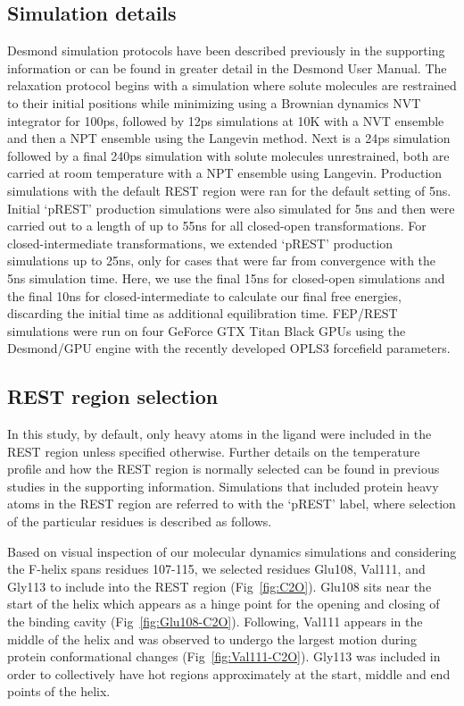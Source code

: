 \documentclass[journal=jctcce,manuscript=article]{achemso}
\begin{document}
\subsection*{Simulation details}
Desmond\cite{DESMONDSoftware,DESMONDarticle,DESMONDPaper1,DESMONDPaper2} simulation protocols have been described previously in the supporting information\cite{FEPplus} or can be found in greater detail in the Desmond User Manual\cite{DESMONDManual}.
The relaxation protocol begins with a simulation where solute molecules are restrained to their initial positions while minimizing using a Brownian dynamics NVT integrator for 100ps, followed by 12ps simulations at 10K with a NVT ensemble and then a NPT ensemble using the Langevin method\cite{Langevin}.
Next is a 24ps simulation followed by a final 240ps simulation with solute molecules unrestrained, both are carried at room temperature with a NPT ensemble using Langevin.
Production simulations with the default REST region were ran for the default setting of 5ns. 
Initial `pREST' production simulations were also simulated for 5ns and then were carried out to a length of up to 55ns for all closed-open transformations. 
For closed-intermediate transformations, we extended `pREST' production simulations up to 25ns, only for cases that were far from convergence with the 5ns simulation time.
Here, we use the final 15ns for closed-open simulations and the final 10ns for closed-intermediate to calculate our final free energies, discarding the initial time as additional equilibration time.
FEP/REST simulations were run on four GeForce GTX Titan Black GPUs using the Desmond/GPU engine with the recently developed OPLS3\cite{OPLS3} forcefield parameters.

\subsection*{REST region selection}
In this study, by default, only heavy atoms in the ligand were included in the REST region unless specified otherwise.
Further details on the temperature profile and how the REST region is normally selected can be found in previous studies\cite{FEP/REST,FEPplus} in the supporting information.
Simulations that included protein heavy atoms in the REST region are referred to with the `pREST' label, where selection of the particular residues is described as follows.

Based on visual inspection of our molecular dynamics simulations and considering the F-helix spans residues 107-115, we selected residues Glu108, Val111, and Gly113 to include into the REST region (Fig~\ref{fig:C2O}).
Glu108 sits near the start of the helix which appears as a hinge point for the opening and closing of the binding cavity (Fig~\ref{fig:Glu108-C2O}).
Following, Val111 appears in the middle of the helix and was observed to undergo the largest motion during protein conformational changes (Fig~\ref{fig:Val111-C2O}).
Gly113 was included in order to collectively have hot regions approximately at the start, middle and end points of the helix.
\end{document}

